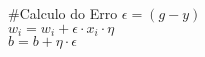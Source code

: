 #Calculo do Erro
\(\epsilon = (g - y)\) \\
\( w_i = w_i + \epsilon \cdot x_i \cdot \eta \) \\
\(b = b + \eta \cdot \epsilon \)